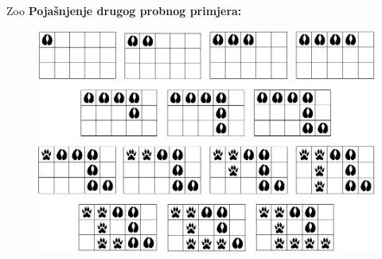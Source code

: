 \begin{statement}[
  problempoints=110,
  timelimit=1 sekunda,
  memorylimit=512 MiB,
]{Zoo}
\textbf{Pojašnjenje drugog probnog primjera:}

\begin{figure}
\centering
\includegraphics[width=\textwidth]{img/escape.png}
\end{figure}




\end{statement}

